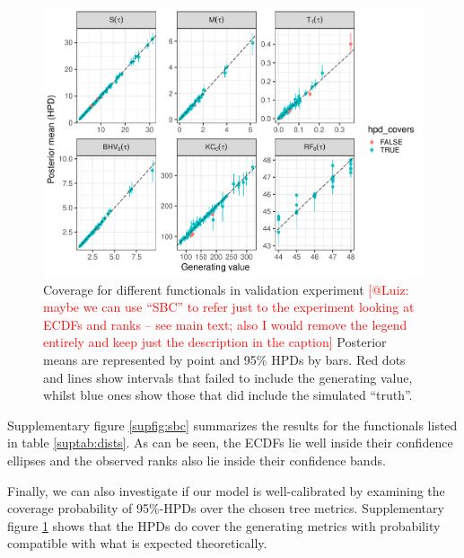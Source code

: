 \documentclass[oneside]{article}
\begin{document}
\begin{figure}
 \includegraphics[width=\textwidth]{../figures/coverage.pdf}
    \caption{Coverage for different functionals in validation experiment
      \textcolor{red}{[@Luiz: maybe we can use
        ``SBC'' to refer just to the experiment looking at ECDFs and
        ranks -- see main text; also I would
     remove the legend entirely and keep just the description
   in the caption]}
      Posterior means are represented by point and 95\% HPDs by bars.
      Red dots and lines show intervals that failed to include the
      generating value, whilst blue ones show those that did include
      the simulated ``truth''.}
  \label{supfig:phylo_calibration}
\end{figure}

Supplementary figure \ref{supfig:sbc} summarizes the results for the functionals
listed in table \ref{suptab:dists}.
As can be seen, the ECDFs lie well inside their confidence ellipses
and the observed ranks also lie inside their confidence bands.

Finally, we can also investigate if our model is well-calibrated
by examining the coverage probability of 95\%-HPDs over the chosen
tree metrics.
Supplementary figure \ref{supfig:phylo_calibration} shows that the HPDs do cover the
generating metrics with probability compatible with what is expected
theoretically.
\end{document}
